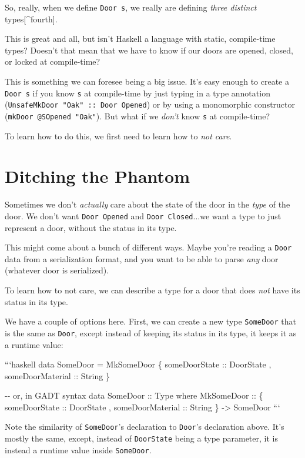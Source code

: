\documentclass[]{article}
\begin{document}
So, really, when we define \texttt{Door\ s}, we really are defining \emph{three
distinct} types{[}\^{}fourth{]}.

This is great and all, but isn't Haskell a language with static, compile-time
types? Doesn't that mean that we have to know if our doors are opened, closed,
or locked at compile-time?

This is something we can foresee being a big issue. It's easy enough to create a
\texttt{Door\ s} if you know \texttt{s} at compile-time by just typing in a type
annotation (\texttt{UnsafeMkDoor\ "Oak"\ ::\ Door\ \textquotesingle{}Opened}) or
by using a monomorphic constructor (\texttt{mkDoor\ @SOpened\ "Oak"}). But what
if we \emph{don't} know \texttt{s} at compile-time?

To learn how to do this, we first need to learn how to \emph{not care}.

\section{Ditching the Phantom}

Sometimes we don't \emph{actually} care about the state of the door in the
\emph{type} of the door. We don't want \texttt{Door\ \textquotesingle{}Opened}
and \texttt{Door\ \textquotesingle{}Closed}...we want a type to just represent a
door, without the status in its type.

This might come about a bunch of different ways. Maybe you're reading a
\texttt{Door} data from a serialization format, and you want to be able to parse
\emph{any} door (whatever door is serialized).

To learn how to not care, we can describe a type for a door that does \emph{not}
have its status in its type.

We have a couple of options here. First, we can create a new type
\texttt{SomeDoor} that is the same as \texttt{Door}, except instead of keeping
its status in its type, it keeps it as a runtime value:

```haskell data SomeDoor = MkSomeDoor \{ someDoorState :: DoorState ,
someDoorMaterial :: String \}

-\/- or, in GADT syntax data SomeDoor :: Type where MkSomeDoor :: \{
someDoorState :: DoorState , someDoorMaterial :: String \} -\textgreater{}
SomeDoor ```

Note the similarity of \texttt{SomeDoor}'s declaration to \texttt{Door}'s
declaration above. It's mostly the same, except, instead of \texttt{DoorState}
being a type parameter, it is instead a runtime value inside \texttt{SomeDoor}.
\end{document}
